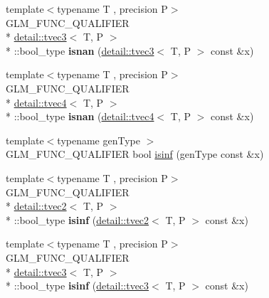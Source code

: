 \begin{DoxyCompactItemize}
\item 
\hypertarget{namespaceglm_a57c553ad2d64fe7bd1625d3dddcf65b7}{{\footnotesize template$<$typename T , precision P$>$ }\\G\-L\-M\-\_\-\-F\-U\-N\-C\-\_\-\-Q\-U\-A\-L\-I\-F\-I\-E\-R \\*
\hyperlink{structglm_1_1detail_1_1tvec3}{detail\-::tvec3}$<$ T, P $>$\\*
\-::bool\-\_\-type {\bfseries isnan} (\hyperlink{structglm_1_1detail_1_1tvec3}{detail\-::tvec3}$<$ T, P $>$ const \&x)}\label{namespaceglm_a57c553ad2d64fe7bd1625d3dddcf65b7}

\item 
\hypertarget{namespaceglm_aeec38530b971a61c8e7eddbaef854498}{{\footnotesize template$<$typename T , precision P$>$ }\\G\-L\-M\-\_\-\-F\-U\-N\-C\-\_\-\-Q\-U\-A\-L\-I\-F\-I\-E\-R \\*
\hyperlink{structglm_1_1detail_1_1tvec4}{detail\-::tvec4}$<$ T, P $>$\\*
\-::bool\-\_\-type {\bfseries isnan} (\hyperlink{structglm_1_1detail_1_1tvec4}{detail\-::tvec4}$<$ T, P $>$ const \&x)}\label{namespaceglm_aeec38530b971a61c8e7eddbaef854498}

\item 
{\footnotesize template$<$typename gen\-Type $>$ }\\G\-L\-M\-\_\-\-F\-U\-N\-C\-\_\-\-Q\-U\-A\-L\-I\-F\-I\-E\-R bool \hyperlink{group__core__func__common_ga9fce6a337c7e8ad089b9dc17c70cb873}{isinf} (gen\-Type const \&x)
\item 
\hypertarget{namespaceglm_ab39af0e09cb831f24caeddc6268544a8}{{\footnotesize template$<$typename T , precision P$>$ }\\G\-L\-M\-\_\-\-F\-U\-N\-C\-\_\-\-Q\-U\-A\-L\-I\-F\-I\-E\-R \\*
\hyperlink{structglm_1_1detail_1_1tvec2}{detail\-::tvec2}$<$ T, P $>$\\*
\-::bool\-\_\-type {\bfseries isinf} (\hyperlink{structglm_1_1detail_1_1tvec2}{detail\-::tvec2}$<$ T, P $>$ const \&x)}\label{namespaceglm_ab39af0e09cb831f24caeddc6268544a8}

\item 
\hypertarget{namespaceglm_a8a5d58940820a56efe7f242f1730514e}{{\footnotesize template$<$typename T , precision P$>$ }\\G\-L\-M\-\_\-\-F\-U\-N\-C\-\_\-\-Q\-U\-A\-L\-I\-F\-I\-E\-R \\*
\hyperlink{structglm_1_1detail_1_1tvec3}{detail\-::tvec3}$<$ T, P $>$\\*
\-::bool\-\_\-type {\bfseries isinf} (\hyperlink{structglm_1_1detail_1_1tvec3}{detail\-::tvec3}$<$ T, P $>$ const \&x)}\label{namespaceglm_a8a5d58940820a56efe7f242f1730514e}


\end{DoxyCompactItemize}
